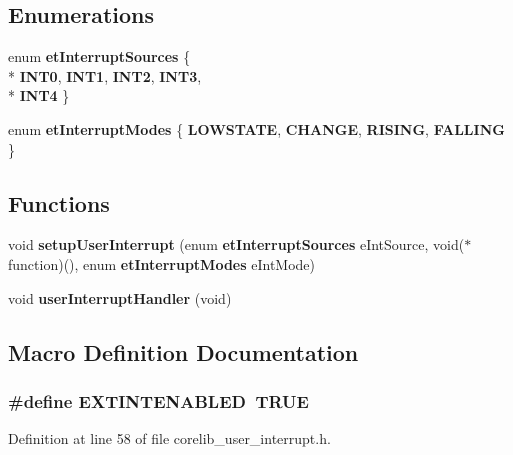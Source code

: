 \subsection*{Enumerations}
\begin{DoxyCompactItemize}
\item 
enum {\bf et\-Interrupt\-Sources} \{ \\*
{\bf I\-N\-T0}, 
{\bf I\-N\-T1}, 
{\bf I\-N\-T2}, 
{\bf I\-N\-T3}, 
\\*
{\bf I\-N\-T4}
 \}
\item 
enum {\bf et\-Interrupt\-Modes} \{ {\bf L\-O\-W\-S\-T\-A\-T\-E}, 
{\bf C\-H\-A\-N\-G\-E}, 
{\bf R\-I\-S\-I\-N\-G}, 
{\bf F\-A\-L\-L\-I\-N\-G}
 \}
\end{DoxyCompactItemize}
\subsection*{Functions}
\begin{DoxyCompactItemize}
\item 
void {\bf setup\-User\-Interrupt} (enum {\bf et\-Interrupt\-Sources} e\-Int\-Source, void($\ast$function)(), enum {\bf et\-Interrupt\-Modes} e\-Int\-Mode)
\item 
void {\bf user\-Interrupt\-Handler} (void)
\end{DoxyCompactItemize}


\subsection{Macro Definition Documentation}
\subsubsection[{E\-X\-T\-I\-N\-T\-E\-N\-A\-B\-L\-E\-D}]{\setlength{\rightskip}{0pt plus 5cm}\#define E\-X\-T\-I\-N\-T\-E\-N\-A\-B\-L\-E\-D~{\bf T\-R\-U\-E}}\label{corelib__user__interrupt_8h_a07ba89377226d3c36408d7576297952d}


Definition at line 58 of file corelib\-\_\-user\-\_\-interrupt.\-h.

